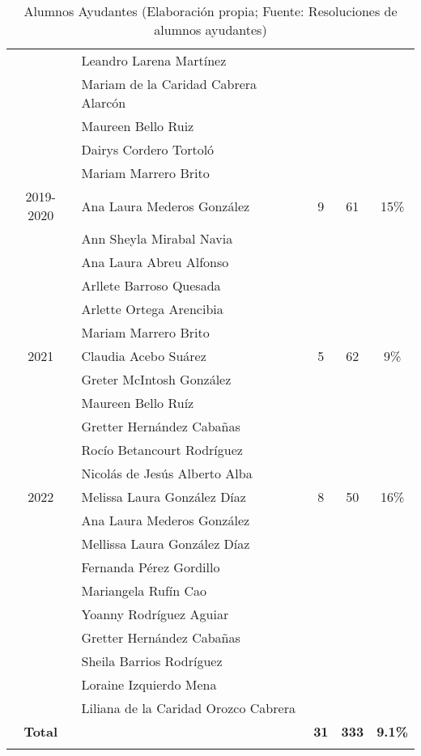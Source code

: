 \begin{longtable}{|c|p{7cm}|c|c|c|}
    \cline{2-2}
	& Leandro Larena Martínez& & & \\
	\cline{2-2}
	& Mariam de la Caridad Cabrera Alarcón& & & \\
	\cline{2-2}
	& Maureen Bello Ruiz& & & \\
	\cline{2-2}
	& Dairys Cordero Tortoló& & & \\
	\cline{2-2}
	& Mariam Marrero Brito& & & \\
	\hline
	2019-2020& Ana Laura Mederos González& 9 & 61 & 15\% \\
	\cline{2-2}
	& Ann Sheyla Mirabal Navia& & & \\
	\cline{2-2}
	& Ana Laura Abreu Alfonso& & & \\
	\cline{2-2}
	& Arllete Barroso Quesada& & & \\
	\cline{2-2}
	& Arlette Ortega Arencibia& & & \\
	\cline{2-2}
	& Mariam Marrero Brito& & & \\
	\hline
	
	2021& Claudia Acebo Suárez& 5 & 62 & 9\% \\

	\cline{2-2}
	& Greter McIntosh González & & & \\

	\cline{2-2}
	& Maureen Bello Ruíz& & & \\
	\cline{2-2}
	& Gretter Hernández Cabañas& & & \\
	\cline{2-2}
	& Rocío Betancourt Rodríguez& & & \\
	\cline{2-2}
	& Nicolás de Jesús Alberto Alba& & & \\
	\hline
	2022& Melissa Laura González Díaz& 8 & 50 &  16\%\\
	\cline{2-2}
	& Ana Laura Mederos González & & & \\
	\cline{2-2}
	& Mellissa Laura González Díaz& & & \\
	\cline{2-2}
	& Fernanda Pérez Gordillo& & & \\
	\cline{2-2}
	& Mariangela Rufín Cao& & & \\
	\cline{2-2}
	& Yoanny Rodríguez Aguiar& & & \\
	\cline{2-2}
	& Gretter Hernández Cabañas& & & \\
	\cline{2-2}
	& Sheila Barrios Rodríguez& & & \\
	\cline{2-2}
	& Loraine Izquierdo Mena& & & \\
	\cline{2-2}
	& Liliana de la Caridad Orozco Cabrera & & & \\
	\hline
	\textbf{Total}& & \textbf{31}& \textbf{333} & \textbf{9.1\%} \\
	\hline
	
	\caption{Alumnos Ayudantes (Elaboración propia; Fuente: Resoluciones de alumnos ayudantes)}
	\label{tab:AlumnosAyudantes}
\end{longtable}

